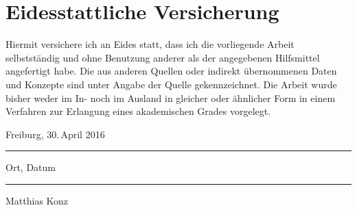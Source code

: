 \thispagestyle{empty}
\section*{Eidesstattliche Versicherung}
Hiermit versichere ich an Eides statt, dass ich die vorliegende Arbeit selbstständig und ohne Benutzung anderer als der angegebenen Hilfsmittel angefertigt habe.
Die aus anderen Quellen oder indirekt übernommenen Daten und Konzepte sind unter Angabe der Quelle gekennzeichnet.
Die Arbeit wurde bisher weder im In- noch im Ausland in gleicher oder ähnlicher Form in einem Verfahren zur Erlangung eines akademischen Grades vorgelegt.

\vspace{2cm}

\parbox{6cm}{
  \centering
  Freiburg, 30.\,April 2016 
  \hrule
  \strut \centering\footnotesize Ort, Datum}%
\hfill%
\parbox{6cm}{
  \phantom{Freiburg, 30.\,April 2016}
  \hrule
  \strut \centering\footnotesize Matthias Konz}

\clearpage